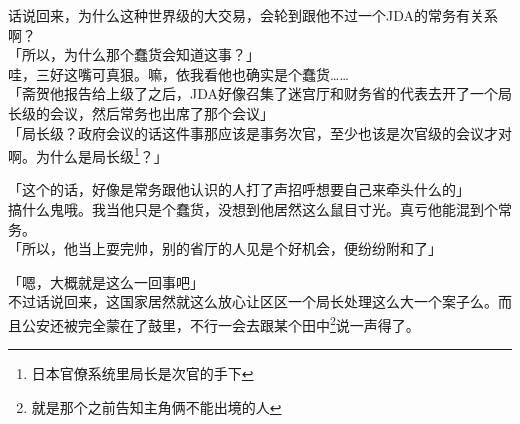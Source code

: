 话说回来，为什么这种世界级的大交易，会轮到跟他不过一个JDA的常务有关系啊？\\

「所以，为什么那个蠢货会知道这事？」\\

哇，三好这嘴可真狠。嘛，依我看他也确实是个蠢货……\\

「斋贺他报告给上级了之后，JDA好像召集了迷宫厅和财务省的代表去开了一个局长级的会议，然后常务也出席了那个会议」\\

「局长级？政府会议的话这件事那应该是事务次官，至少也该是次官级的会议才对啊。为什么是局长级\footnote{日本官僚系统里局长是次官的手下}？」

「这个的话，好像是常务跟他认识的人打了声招呼想要自己来牵头什么的」\\

搞什么鬼哦。我当他只是个蠢货，没想到他居然这么鼠目寸光。真亏他能混到个常务。\\

「所以，他当上耍完帅，别的省厅的人见是个好机会，便纷纷附和了」

「嗯，大概就是这么一回事吧」\\

不过话说回来，这国家居然就这么放心让区区一个局长处理这么大一个案子么。而且公安还被完全蒙在了鼓里，不行一会去跟某个田中\footnote{就是那个之前告知主角俩不能出境的人}说一声得了。\\

